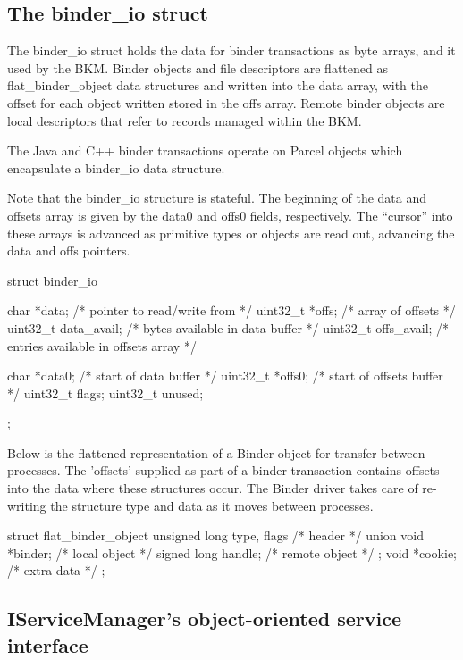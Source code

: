 \documentclass[prodmode]{acmlarge}
\begin{document}
\subsection{The binder\_io struct}
\label{app:binder_io}
The binder\_io struct holds the data for binder transactions as byte arrays, and it used by the BKM. Binder objects and file descriptors are flattened as flat\_binder\_object data structures and written into the data array, with the offset for each object written stored in the offs array. Remote binder objects are local descriptors that refer to records managed within the BKM.

The Java and C++ binder transactions operate on Parcel objects which encapsulate a binder\_io data structure.

Note that the binder\_io structure is stateful. The beginning of the data and offsets array is given by the data0 and offs0 fields, respectively. The ``cursor'' into these arrays is advanced as primitive types or objects are read out, advancing the data and offs pointers.

\begin{snippet}
struct binder_io
{
    char *data;            /* pointer to read/write from */
    uint32_t *offs;        /* array of offsets */
    uint32_t data_avail;   /* bytes available in data buffer */
    uint32_t offs_avail;   /* entries available in offsets array */

    char *data0;           /* start of data buffer */
    uint32_t *offs0;       /* start of offsets buffer */
    uint32_t flags;
    uint32_t unused;
};
\end{snippet}

Below is the flattened representation of a Binder object for transfer
between processes.  The 'offsets' supplied as part of a binder transaction
contains offsets into the data where these structures occur.  The Binder
driver takes care of re-writing the structure type and data as it moves
between processes.

\begin{snippet}
struct flat_binder_object {
  unsigned long type, flags  /* header */
  union {
    void *binder;        /* local object */
    signed long handle;  /* remote object */
  };
  void *cookie;          /* extra data */
};
\end{snippet}

\subsection{IServiceManager's object-oriented service interface}
\label{app:ServiceManager}
\end{document}
